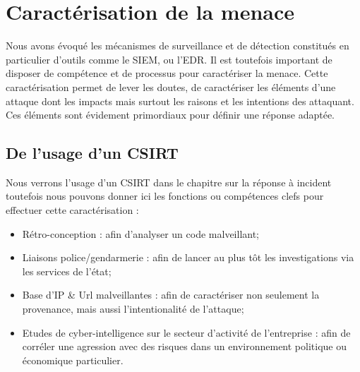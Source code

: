 
\section{Caractérisation de la menace}

Nous avons évoqué les mécanismes de surveillance et de détection constitués en particulier d'outils comme le SIEM, ou l'EDR.
Il est toutefois important de disposer de compétence et de processus pour caractériser la menace.
Cette caractérisation permet de lever les doutes, de caractériser les éléments d'une attaque dont les impacts mais surtout les raisons et les intentions des attaquant. Ces éléments sont évidement primordiaux pour définir une réponse adaptée.

\subsection{De l'usage d'un CSIRT}

Nous verrons l'usage d'un CSIRT dans le chapitre sur la réponse à incident toutefois nous pouvons donner ici les fonctions ou compétences clefs pour effectuer cette caractérisation :

\begin{itemize}
  \item Rétro-conception : afin d'analyser un code malveillant;
  \item Liaisons police/gendarmerie : afin de lancer au plus tôt les investigations via les services de l'état;
  \item Base  d'IP \& Url malveillantes : afin de caractériser non seulement la provenance, mais aussi l'intentionalité de l'attaque;
  \item Etudes de cyber-intelligence sur le secteur d'activité de l'entreprise : afin de corréler une agression avec des risques dans un environnement politique ou économique particulier.
\end{itemize}
